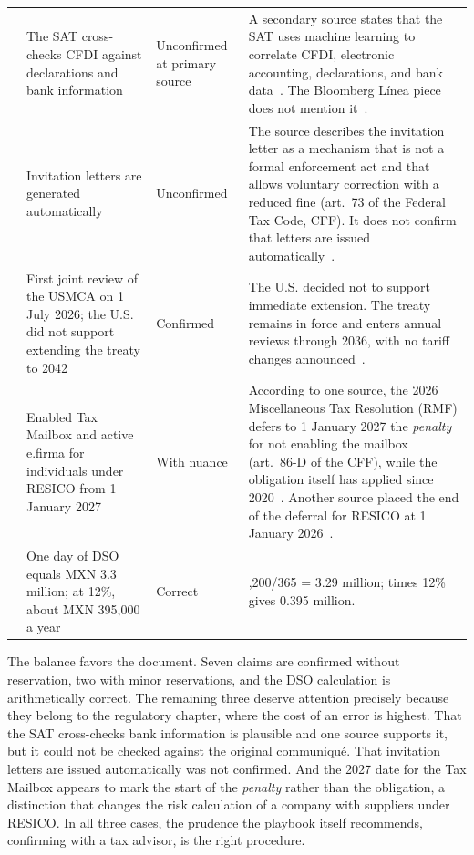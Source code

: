 \documentclass[11pt,a4paper]{article}
\begin{document}
{\begin{longtable}{@{}>{\raggedright\arraybackslash}p{0.2cm}>{\raggedright\arraybackslash}p{3.4cm}>{\raggedright\arraybackslash}p{2.3cm}>{\raggedright\arraybackslash}p{8.2cm}@{}}
9 & The SAT cross-checks CFDI against declarations and bank information & Unconfirmed at primary source & A secondary source states that the SAT uses machine learning to correlate CFDI, electronic accounting, declarations, and bank data~\cite{sad}. The Bloomberg L\'inea piece does not mention it~\cite{bl}. \\
10 & Invitation letters are generated automatically & Unconfirmed & The source describes the invitation letter as a mechanism that is not a formal enforcement act and that allows voluntary correction with a reduced fine (art.~73 of the Federal Tax Code, CFF). It does not confirm that letters are issued automatically~\cite{sad}. \\
11 & First joint review of the USMCA on 1 July 2026; the U.S. did not support extending the treaty to 2042 & Confirmed & The U.S. decided not to support immediate extension. The treaty remains in force and enters annual reviews through 2036, with no tariff changes announced~\cite{pwc}. \\
12 & Enabled Tax Mailbox and active e.firma for individuals under RESICO from 1 January 2027 & With nuance & According to one source, the 2026 Miscellaneous Tax Resolution (RMF) defers to 1 January 2027 the \emph{penalty} for not enabling the mailbox (art.~86-D of the CFF), while the obligation itself has applied since 2020~\cite{proceso}. Another source placed the end of the deferral for RESICO at 1 January 2026~\cite{contrib}. \\
13 & One day of DSO equals MXN 3.3 million; at 12\%, about MXN 395,000 a year & Correct & 1,200/365 = 3.29 million; times 12\% gives 0.395 million. \\
\end{longtable}
}

The balance favors the document. Seven claims are confirmed without reservation, two with minor reservations, and the DSO calculation is arithmetically correct. The remaining three deserve attention precisely because they belong to the regulatory chapter, where the cost of an error is highest. That the SAT cross-checks bank information is plausible and one source supports it, but it could not be checked against the original communiqu\'e. That invitation letters are issued automatically was not confirmed. And the 2027 date for the Tax Mailbox appears to mark the start of the \emph{penalty} rather than the obligation, a distinction that changes the risk calculation of a company with suppliers under RESICO. In all three cases, the prudence the playbook itself recommends, confirming with a tax advisor, is the right procedure.
\end{document}
